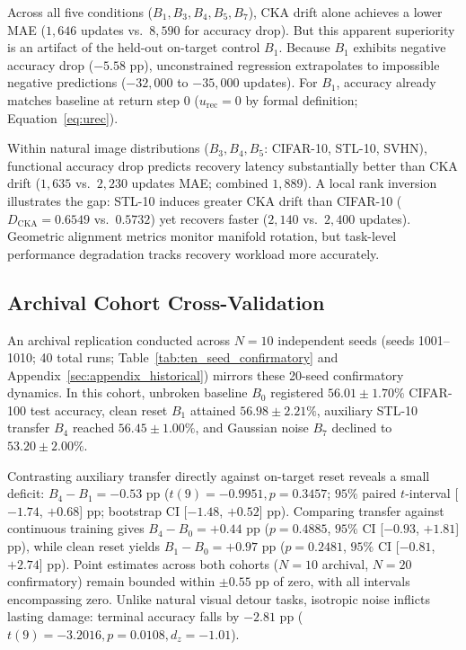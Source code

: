 \documentclass[sn-mathphys,Numbered]{sn-jnl}
\newcommand{\Dcka}{D_{\mathrm{CKA}}}
\begin{document}
Across all five conditions ($B_1, B_3, B_4, B_5, B_7$), CKA drift alone achieves a lower MAE ($1{,}646$ updates vs.\ $8{,}590$ for accuracy drop). But this apparent superiority is an artifact of the held-out on-target control $B_1$. Because $B_1$ exhibits negative accuracy drop ($-5.58$ pp), unconstrained regression extrapolates to impossible negative predictions ($-32{,}000$ to $-35{,}000$ updates). For $B_1$, accuracy already matches baseline at return step 0 ($u_{\mathrm{rec}} = 0$ by formal definition; Equation~\ref{eq:urec}).

Within natural image distributions ($B_3, B_4, B_5$: CIFAR-10, STL-10, SVHN), functional accuracy drop predicts recovery latency substantially better than CKA drift ($1{,}635$ vs.\ $2{,}230$ updates MAE; combined $1{,}889$). A local rank inversion illustrates the gap: STL-10 induces greater CKA drift than CIFAR-10 ($\Dcka = 0.6549$ vs.\ $0.5732$) yet recovers faster ($2{,}140$ vs.\ $2{,}400$ updates). Geometric alignment metrics monitor manifold rotation, but task-level performance degradation tracks recovery workload more accurately.

\subsection{Archival Cohort Cross-Validation}\label{subsec:results_historical}\label{subsec:results_ten_seed_cohort}

An archival replication conducted across $N = 10$ independent seeds (seeds 1001--1010; 40 total runs; Table~\ref{tab:ten_seed_confirmatory} and Appendix~\ref{sec:appendix_historical}) mirrors these 20-seed confirmatory dynamics. In this cohort, unbroken baseline $B_0$ registered $56.01 \pm 1.70\%$ CIFAR-100 test accuracy, clean reset $B_1$ attained $56.98 \pm 2.21\%$, auxiliary STL-10 transfer $B_4$ reached $56.45 \pm 1.00\%$, and Gaussian noise $B_7$ declined to $53.20 \pm 2.00\%$.

Contrasting auxiliary transfer directly against on-target reset reveals a small deficit: $B_4 - B_1 = -0.53$ pp ($t(9) = -0.9951, p = 0.3457$; $95\%$ paired $t$-interval [$-1.74$, $+0.68$] pp; bootstrap CI [$-1.48$, $+0.52$] pp). Comparing transfer against continuous training gives $B_4 - B_0 = +0.44$ pp ($p = 0.4885$, $95\%$ CI [$-0.93$, $+1.81$] pp), while clean reset yields $B_1 - B_0 = +0.97$ pp ($p = 0.2481$, $95\%$ CI [$-0.81$, $+2.74$] pp). Point estimates across both cohorts ($N = 10$ archival, $N = 20$ confirmatory) remain bounded within $\pm 0.55$ pp of zero, with all intervals encompassing zero. Unlike natural visual detour tasks, isotropic noise inflicts lasting damage: terminal accuracy falls by $-2.81$ pp ($t(9) = -3.2016, p = 0.0108, d_z = -1.01$).
\end{document}
